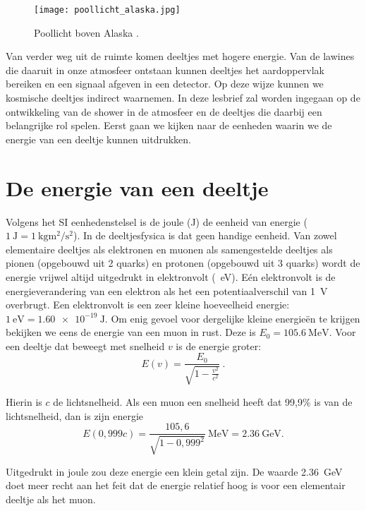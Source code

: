 \begin{figure}
    \centering
    \texttt{[image: poollicht\_alaska.jpg]}
    \caption{Poollicht boven Alaska \cite{strang}.}
    \label{fig:poollicht}
\end{figure}

Van verder weg uit de ruimte komen deeltjes met hogere energie. Van de
lawines die daaruit in onze atmosfeer ontstaan kunnen deeltjes het
aardoppervlak bereiken en een signaal afgeven in een \hisparc detector.
Op deze wijze kunnen we kosmische deeltjes indirect waarnemen. In deze
lesbrief zal worden ingegaan op de ontwikkeling van de shower in de
atmosfeer en de deeltjes die daarbij een belangrijke rol spelen. Eerst
gaan we kijken naar de eenheden waarin we de energie van een deeltje
kunnen uitdrukken. 


\section{De energie van een deeltje}

Volgens het SI eenhedenstelsel is de joule (J) de eenheid van energie
($\SI{1}{\joule} = \SI{1}{\kilo\gram\square\meter\per\square\second}$).
In de deeltjesfysica is dat geen handige eenheid. Van zowel elementaire
deeltjes als elektronen en muonen als samengestelde deeltjes als pionen
(opgebouwd uit 2 quarks) en protonen (opgebouwd uit 3 quarks) wordt de
energie vrijwel altijd uitgedrukt in elektronvolt
(\SI{}{\electronvolt}). Eén elektronvolt is de energieverandering van
een elektron als het een potentiaalverschil van \SI{1}{\volt} overbrugt.
Een elektronvolt is een zeer kleine hoeveelheid energie:
$\SI{1}{\electronvolt} = \SI{1,60e-19}{\joule}$. Om enig gevoel voor
dergelijke kleine energieën te krijgen bekijken we eens de energie van
een muon in rust. Deze is $E_0 = \SI{105,6}{\mega\electronvolt}$. Voor
een deeltje dat beweegt met snelheid $v$ is de energie groter:
\begin{equation}
    E(v) = \frac{E_0}{\sqrt{1-\frac{v^2}{c^2}}} \ . \nonumber
\end{equation}

Hierin is $c$ de lichtsnelheid. Als een muon een snelheid heeft dat
99,9\% is van de lichtsnelheid, dan is zijn energie 
\begin{equation}
    E(0,999c) = \frac{105,6}{\sqrt{1-0,999^2}}\SI{}{\mega\electronvolt}
    = \SI{2,36}{\giga\electronvolt}. \nonumber
\end{equation}

Uitgedrukt in joule zou deze energie een klein getal zijn. De waarde
\SI{2,36}{\giga\electronvolt} doet meer recht aan het feit dat de
energie relatief hoog is voor een elementair deeltje als het muon. 
\\

